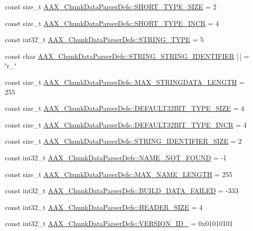 \begin{DoxyCompactItemize}
\item 
const size\+\_\+t \mbox{\hyperlink{a00851_a6807b39d59eed044eeefbd82c1fc9197}{A\+A\+X\+\_\+\+Chunk\+Data\+Parser\+Defs\+::\+S\+H\+O\+R\+T\+\_\+\+T\+Y\+P\+E\+\_\+\+S\+I\+ZE}} = 2
\item 
const size\+\_\+t \mbox{\hyperlink{a00851_a9aefe47f82372a9983eb5c00c14ac766}{A\+A\+X\+\_\+\+Chunk\+Data\+Parser\+Defs\+::\+S\+H\+O\+R\+T\+\_\+\+T\+Y\+P\+E\+\_\+\+I\+N\+CR}} = 4
\item 
const int32\+\_\+t \mbox{\hyperlink{a00851_aa7125477a4c5349f73b433334e9c4254}{A\+A\+X\+\_\+\+Chunk\+Data\+Parser\+Defs\+::\+S\+T\+R\+I\+N\+G\+\_\+\+T\+Y\+PE}} = 5
\item 
const char \mbox{\hyperlink{a00851_a3004646ddde8fc7d2ddf5402f50734f4}{A\+A\+X\+\_\+\+Chunk\+Data\+Parser\+Defs\+::\+S\+T\+R\+I\+N\+G\+\_\+\+S\+T\+R\+I\+N\+G\+\_\+\+I\+D\+E\+N\+T\+I\+F\+I\+ER}} \mbox{[}$\,$\mbox{]} = \char`\"{}r\+\_\+\char`\"{}
\item 
const size\+\_\+t \mbox{\hyperlink{a00851_a7c0e3fa427134810f5f7e12ae51c0e4e}{A\+A\+X\+\_\+\+Chunk\+Data\+Parser\+Defs\+::\+M\+A\+X\+\_\+\+S\+T\+R\+I\+N\+G\+D\+A\+T\+A\+\_\+\+L\+E\+N\+G\+TH}} = 255
\item 
const size\+\_\+t \mbox{\hyperlink{a00851_af40b7896c48bd8bb3ac060601e5e6945}{A\+A\+X\+\_\+\+Chunk\+Data\+Parser\+Defs\+::\+D\+E\+F\+A\+U\+L\+T32\+B\+I\+T\+\_\+\+T\+Y\+P\+E\+\_\+\+S\+I\+ZE}} = 4
\item 
const size\+\_\+t \mbox{\hyperlink{a00851_a6d7547242543558d67e96139a5627dd2}{A\+A\+X\+\_\+\+Chunk\+Data\+Parser\+Defs\+::\+D\+E\+F\+A\+U\+L\+T32\+B\+I\+T\+\_\+\+T\+Y\+P\+E\+\_\+\+I\+N\+CR}} = 4
\item 
const size\+\_\+t \mbox{\hyperlink{a00851_a11fc46547f00cbbe29b02b1ebd0f3dd0}{A\+A\+X\+\_\+\+Chunk\+Data\+Parser\+Defs\+::\+S\+T\+R\+I\+N\+G\+\_\+\+I\+D\+E\+N\+T\+I\+F\+I\+E\+R\+\_\+\+S\+I\+ZE}} = 2
\item 
const int32\+\_\+t \mbox{\hyperlink{a00851_a4af33563bfa9a20e489750090bb68329}{A\+A\+X\+\_\+\+Chunk\+Data\+Parser\+Defs\+::\+N\+A\+M\+E\+\_\+\+N\+O\+T\+\_\+\+F\+O\+U\+ND}} = -\/1
\item 
const size\+\_\+t \mbox{\hyperlink{a00851_a8cd7e74db8ce7ce5c4efdb9c5388742a}{A\+A\+X\+\_\+\+Chunk\+Data\+Parser\+Defs\+::\+M\+A\+X\+\_\+\+N\+A\+M\+E\+\_\+\+L\+E\+N\+G\+TH}} = 255
\item 
const int32\+\_\+t \mbox{\hyperlink{a00851_ab6190197be23431113a1f2b3f445ac9d}{A\+A\+X\+\_\+\+Chunk\+Data\+Parser\+Defs\+::\+B\+U\+I\+L\+D\+\_\+\+D\+A\+T\+A\+\_\+\+F\+A\+I\+L\+ED}} = -\/333
\item 
const int32\+\_\+t \mbox{\hyperlink{a00851_a4781240b7c5d7e82d07278fd9e6f7524}{A\+A\+X\+\_\+\+Chunk\+Data\+Parser\+Defs\+::\+H\+E\+A\+D\+E\+R\+\_\+\+S\+I\+ZE}} = 4
\item 
const int32\+\_\+t \mbox{\hyperlink{a00851_ae795429da33216b570397920343b8f05}{A\+A\+X\+\_\+\+Chunk\+Data\+Parser\+Defs\+::\+V\+E\+R\+S\+I\+O\+N\+\_\+\+I\+D\+\_}} = 0x01010101
\end{DoxyCompactItemize}


